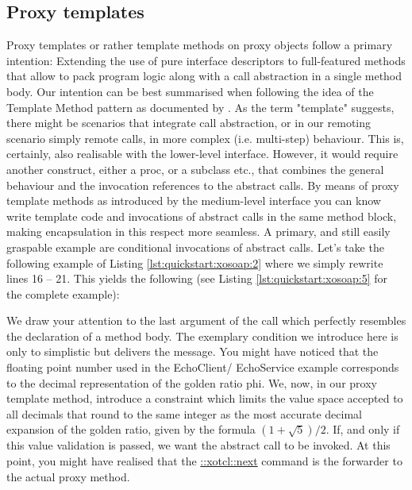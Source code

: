  \subsection{Proxy templates}\label{sec:advanced:template}
Proxy templates or rather template methods on proxy objects follow a primary intention: Extending the 
use of pure interface descriptors to full-featured methods that allow to pack program logic along with a 
call abstraction in a single method body. Our intention can be best summarised when following the idea 
of the Template Method pattern as documented by \cite{gof:1994}. As the term "template" suggests, there 
might be scenarios that integrate call abstraction, or in our remoting scenario simply remote calls, in 
more complex (i.e. multi-step) behaviour. This is, certainly, also realisable with the lower-level interface. 
However, it would require another construct, either a proc, or a subclass etc., that combines the general 
behaviour and the invocation references to the abstract calls. By means of proxy template methods as 
introduced by the medium-level interface you can know write template code and invocations of 
abstract calls in the same method block, making encapsulation in this respect more seamless. A 
primary, and still easily graspable example are conditional invocations of abstract calls. Let's take the 
following example of Listing \ref{lst:quickstart:xosoap:2} where we simply rewrite lines 16 -- 21. This 
yields the following (see Listing \ref{lst:quickstart:xosoap:5} for the complete example): 

We draw your attention to the last argument of the  call which perfectly resembles the declaration of a method body. The exemplary condition we introduce here is only to simplistic but 
delivers the message. You might have noticed that the floating point number used in the EchoClient/
EchoService example corresponds to the decimal representation of the golden ratio phi. We, now, in our 
proxy template method, introduce a constraint which limits the value space accepted to all decimals that 
round to the same integer as the most accurate decimal expansion of the golden ratio, given by the 
formula \begin{math} (1 + \sqrt{5}) / 2\end{math}. If, and only if this value validation is passed, we want 
the abstract call to be invoked. At this point, you might have realised that the \href{http://media.wu-wien.ac.at/doc/tutorial.html#class_method_chaining}{::xotcl::next} command is the 
forwarder to the actual proxy method. 

